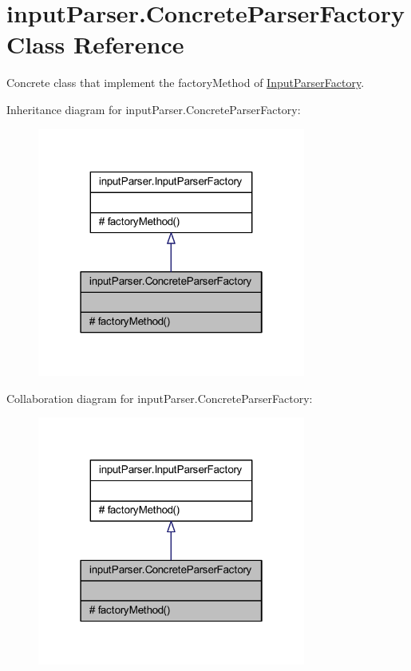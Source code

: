 \hypertarget{classinput_parser_1_1_concrete_parser_factory}{\section{input\-Parser.\-Concrete\-Parser\-Factory Class Reference}
\label{classinput_parser_1_1_concrete_parser_factory}
}


Concrete class that implement the factory\-Method of \hyperlink{classinput_parser_1_1_input_parser_factory}{Input\-Parser\-Factory}.  




Inheritance diagram for input\-Parser.\-Concrete\-Parser\-Factory\-:
\nopagebreak
\begin{figure}[H]
\begin{center}
\leavevmode
\includegraphics[width=250pt]{classinput_parser_1_1_concrete_parser_factory__inherit__graph}
\end{center}
\end{figure}


Collaboration diagram for input\-Parser.\-Concrete\-Parser\-Factory\-:
\nopagebreak
\begin{figure}[H]
\begin{center}
\leavevmode
\includegraphics[width=250pt]{classinput_parser_1_1_concrete_parser_factory__coll__graph}
\end{center}
\end{figure}
